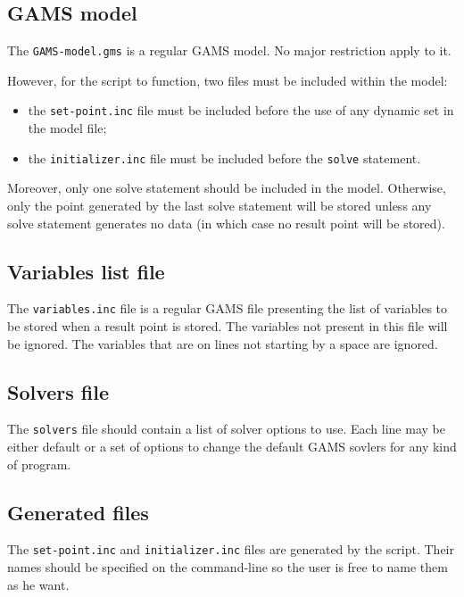\subsection*{GAMS model}

The \texttt{GAMS-model.gms} is a regular GAMS model. No major restriction apply
to it.

However, for the script to function, two files must be included within the
model:
\begin{itemize}
\item the \texttt{set-point.inc} file must be included before the use of any
  dynamic set in the model file;
\item the \texttt{initializer.inc} file must be included before the
  \texttt{solve} statement.
\end{itemize}

Moreover, only one solve statement should be included in the model. Otherwise,
only the point generated by the last solve statement will be stored unless any
solve statement generates no data (in which case no result point will be
stored).

\subsection*{Variables list file}

The \texttt{variables.inc} file is a regular GAMS file presenting the list of
variables to be stored when a result point is stored. The variables not present
in this file will be ignored. The variables that are on lines not starting by a
space are ignored.

\subsection*{Solvers file}

The \texttt{solvers} file should contain a list of solver options to use. Each
line may be either \og default\fg{} or a set of options to change the default
GAMS sovlers for any kind of program.

\subsection*{Generated files}

The \texttt{set-point.inc} and \texttt{initializer.inc} files are generated by
the script. Their names should be specified on the command-line so the user is
free to name them as he want.

